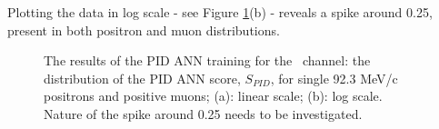 Plotting the data in log scale - see Figure \ref{fig:pid_score_mumep}(b) - reveals a spike around 0.25,
present in both positron and muon distributions.


\begin{figure}[H]
\hspace{-0.6in}
   {
    \label{fig:pid_score_mumep}
    The results of the PID ANN training for the \MuToEp\ channel: the distribution of the PID ANN score, $S_{PID}$,
    for single 92.3 MeV/c positrons and positive muons; (a): linear scale; (b): log scale. \\
    {\red Nature of the spike around 0.25 needs to be investigated.}
  }
\end{figure}
